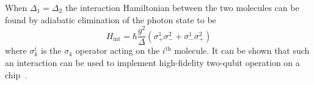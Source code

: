 When $\Delta_1 = \Delta_2$ the interaction Hamiltonian between the two
molecules can be found by adiabatic elimination of the photon state to
be~\cite{Andre2006}
%
\begin{equation}
  H_\text{int} = \hbar \frac{g^2}{\Delta} (\sigma_+^1\sigma_-^2 +
  \sigma_-^1\sigma_+^2)
\end{equation}
%
where $\sigma^i_k$ is the $\sigma_k$ operator acting on the
$i^\text{th}$ molecule. It can be shown that such an interaction can be used to
implement high-fidelity two-qubit operation on a chip~\cite{Andre2006,
PhysRevA.69.062320}.

